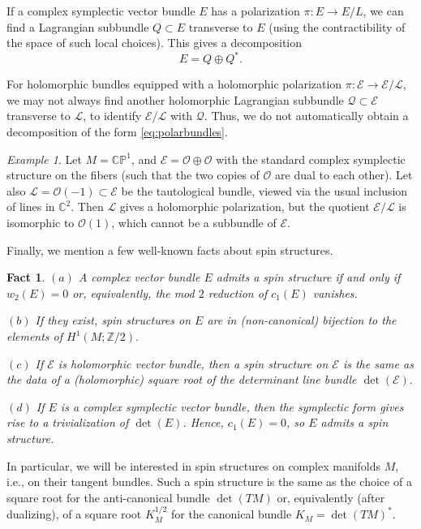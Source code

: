 \documentclass [11pt]{amsart}
\newtheorem {fact}[theorem]{Fact}
\theoremstyle{remark}
\newtheorem {example}[theorem]{Example}
\def\zz {{\mathbb{Z}}}
\def\cc {{\mathbb{C}}}
\def\C{\cc}
\def\Z {\zz}
\def\cp{\mathbb{CP}}
\def\O{\mathcal{O}}
\def\E{\mathcal{E}}
\def\Q{\mathcal{Q}}
\def\O {\mathcal{O}}
\def\L{\mathcal{L}}
\begin{document}
If a complex symplectic vector bundle $E$ has a polarization $\pi: E \to E/L$, we can find a Lagrangian subbundle $Q \subset E$ transverse to $E$ (using the contractibility of the space of such local choices). This gives a decomposition
\begin{equation}
\label{eq:polarbundles}
E = Q \oplus Q^*.
\end{equation}

For holomorphic bundles equipped with a holomorphic polarization $\pi: \E \to \E/\L$, we may not always find another holomorphic Lagrangian subbundle $\Q \subset \E$ transverse to $\L$, to identify $\E/\L$ with $\Q$. Thus, we do not automatically obtain a decomposition of the form  \eqref{eq:polarbundles}. 

\begin{example}
Let $M = \cp^1$, and $\E = \O \oplus \O$ with the standard complex symplectic structure on the fibers (such that the two copies of $\O$ are dual to each other). Let also $\L=\O(-1) \subset \E$ be the tautological bundle, viewed via the usual inclusion of lines in $\C^2$.  Then $\L$ gives a holomorphic polarization, but the quotient $\E/\L$ is isomorphic to $\O(1)$, which cannot be a subbundle of $\E$.
\end{example}

Finally, we mention a few well-known facts about spin structures. 
\begin{fact}
\label{fact:spin}
$(a)$ A complex vector bundle $E$ admits a spin structure if and only if $w_2(E)=0$ or, equivalently, the mod $2$ reduction of $c_1(E)$ vanishes. 

$(b)$ If they exist, spin structures on $E$ are in (non-canonical) bijection to the elements of $H^1(M; \Z/2).$ 

$(c)$ If $\E$ is holomorphic vector bundle, then a spin structure on $\E$ is the same as the data of a (holomorphic) square root of the determinant line bundle $\det(\E).$

$(d)$ If $E$ is a complex symplectic vector bundle, then the symplectic form gives rise to a trivialization of $\det(E)$. Hence, $c_1(E)=0$, so $E$ admits a spin structure. 
\end{fact}
In particular, we will be interested in spin structures on complex manifolds $M$, i.e., on their tangent bundles. Such a spin structure is the same as the choice of a square root for the anti-canonical bundle $\det(TM)$ or, equivalently (after dualizing), of a square root $K_{M}^{1/2}$ for the canonical bundle $K_M=\det(TM)^*$.
\end{document}

